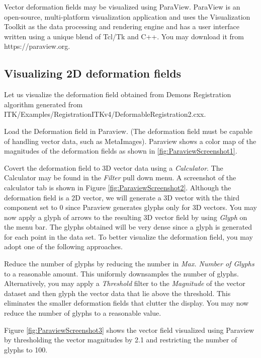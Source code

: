 %
%
%
%
%
%
Vector deformation fields may be visualized using ParaView.
ParaView \cite{ParaviewBook} is an open-source, multi-platform visualization application and uses the Visualization Toolkit as the data processing and rendering engine and has a user interface written using a unique blend of Tcl/Tk and C++. You may download it from https://paraview.org.

\subsection{Visualizing 2D deformation fields}
Let us visualize the deformation field obtained from Demons Registration algorithm generated from ITK/Examples/RegistrationITKv4/DeformableRegistration2.cxx.

Load the Deformation field in Paraview. (The deformation field must be capable of handling vector data, such as MetaImages). Paraview shows a color map of the magnitudes of the deformation fields as shown in \ref{fig:ParaviewScreenshot1}.

Covert the deformation field to 3D vector data using a {\it Calculator}. The Calculator may be found in the {\it Filter} pull down menu. A screenshot of the calculator tab is shown in Figure \ref{fig:ParaviewScreenshot2}. Although the deformation field is a 2D vector, we will generate a 3D vector with the third component set to 0 since Paraview generates glyphs only for 3D vectors. You may now apply a glyph of arrows to the resulting 3D vector field by using {\it Glyph} on the menu bar. The glyphs obtained will be very dense since a glyph is generated for each point in the data set. To better visualize the deformation field, you may adopt one of the following approaches.

Reduce the number of glyphs by reducing the number in {\it Max. Number of Glyphs} to a reasonable amount. This uniformly downsamples the number of glyphs. Alternatively, you may apply a {\it Threshold} filter to the {\it Magnitude} of the vector dataset and then glyph the vector data that lie above the threshold. This eliminates the smaller deformation fields that clutter the display. You may now reduce the number of glyphs to a reasonable value.

Figure \ref{fig:ParaviewScreenshot3} shows the vector field visualized using Paraview by thresholding the vector magnitudes by 2.1 and restricting the number of glyphs to 100.

